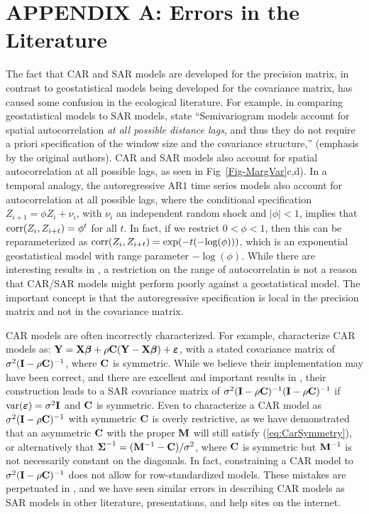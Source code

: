 \documentclass[11pt, titlepage]{article}\usepackage[]{graphicx}\usepackage[]{color}
\begin{document}
\section{APPENDIX A: Errors in the Literature}

The fact that CAR and SAR models are developed for the precision matrix, in contrast to geostatistical models being developed for the covariance matrix, has caused some confusion in the ecological literature.  For example, in comparing geostatistical models to SAR models, \citet{Begu:Puey:comp:2009} state ``Semivariogram models account for spatial autocorrelation \emph{at all possible distance lags}, and thus they do not require a priori specification of the window size and the covariance structure,'' (emphasis by the original authors).  CAR and SAR models also account for spatial autocorrelation at all possible lags, as seen in Fig~\ref{Fig-MargVar}c,d).  In a temporal analogy, the autoregressive AR1 time series models also account for autocorrelation at all possible lags, where the conditional specification $Z_{i+1} = \phi Z_i + \nu_i$, with $\nu_i$ an independent random shock and $|\phi| < 1$, implies that $\textrm{corr}(Z_{i},Z_{i+t}) = \phi^t$ for all $t$.  In fact, if we restrict $0 < \phi < 1$, then this can be reparameterized as $\textrm{corr}(Z_{i},Z_{i+t}) = \exp(-t(-\textrm{log}(\phi)))$, which is an exponential geostatistical model with range parameter $-\log(\phi)$.  While there are interesting results in \citet{Begu:Puey:comp:2009}, a restriction on the range of autocorrelatin is not a reason that CAR/SAR models might perform poorly against a geostatistical model.  The important concept is that the autoregressive specification is local in the precision matrix and not in the covariance matrix.

CAR models are often incorrectly characterized.  For example, \citet{Keit:Bjor:Dixo:Citr:acco:2002} characterize CAR models as: $\mathbf{Y} = \mathbf{X}\mbox{\boldmath $\beta$} + \rho\mathbf{C}(\mathbf{Y} - \mathbf{X}\mbox{\boldmath $\beta$}) + \mbox{\boldmath $\varepsilon$}$, with a stated covariance matrix of $\sigma^2(\mathbf{I} - \rho\mathbf{C})^{-1}$, where $\mathbf{C}$ is symmetric. While we believe their implementation may have been correct, and there are excellent and important results in \citet{Keit:Bjor:Dixo:Citr:acco:2002}, their construction leads to a SAR covariance matrix of $\sigma^2(\mathbf{I} - \rho\mathbf{C})^{-1}(\mathbf{I} - \rho\mathbf{C})^{-1}$ if $\textrm{var}(\mbox{\boldmath $\varepsilon$}) = \sigma^2\mathbf{I}$ and $\mathbf{C}$ is symmetric. Even to characterize a CAR model as $\sigma^2(\mathbf{I} - \rho\mathbf{C})^{-1}$ with symmetric $\mathbf{C}$ is overly restrictive, as we have demonstrated that an asymmetric $\mathbf{C}$ with the proper $\mathbf{M}$ will still satisfy (\ref{eq:CarSymmetry}), or alternatively that $\mbox{\boldmath $\Sigma$}^{-1} = (\mathbf{M}^{-1} - \mathbf{C})/\sigma^2$, where $\mathbf{C}$ is symmetric but $\mathbf{M}^{-1}$ is not necessarily constant on the diagonals. In fact, constraining a CAR model to $\sigma^2(\mathbf{I} - \rho\mathbf{C})^{-1}$ does not allow for row-standardized models.  These mistakes are perpetuated in \citep{Dorm:etal:meth:2007}, and we have seen similar errors in describing CAR models as SAR models in other literature, presentations, and help sites on the internet. 
\end{document}
